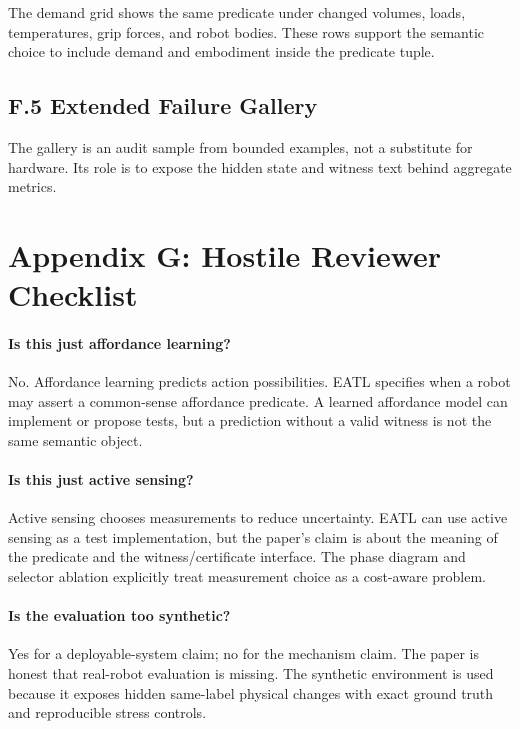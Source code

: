 \documentclass{article}
\begin{document}
The demand grid shows the same predicate under changed volumes, loads,
temperatures, grip forces, and robot bodies.  These rows support the semantic
choice to include demand and embodiment inside the predicate tuple.

\begingroup
\tiny

\endgroup

\subsection{F.5 Extended Failure Gallery}

The gallery is an audit sample from bounded examples, not a substitute for
hardware.  Its role is to expose the hidden state and witness text behind
aggregate metrics.

\begingroup
\tiny

\endgroup

\section{Appendix G: Hostile Reviewer Checklist}

\paragraph{Is this just affordance learning?}
No.  Affordance learning predicts action possibilities.  EATL specifies when a
robot may assert a common-sense affordance predicate.  A learned affordance
model can implement or propose tests, but a prediction without a valid witness
is not the same semantic object.

\paragraph{Is this just active sensing?}
Active sensing chooses measurements to reduce uncertainty.  EATL can use active
sensing as a test implementation, but the paper's claim is about the meaning of
the predicate and the witness/certificate interface.  The phase diagram and
selector ablation explicitly treat measurement choice as a cost-aware problem.

\paragraph{Is the evaluation too synthetic?}
Yes for a deployable-system claim; no for the mechanism claim.  The paper is
honest that real-robot evaluation is missing.  The synthetic environment is used
because it exposes hidden same-label physical changes with exact ground truth
and reproducible stress controls.
\end{document}
